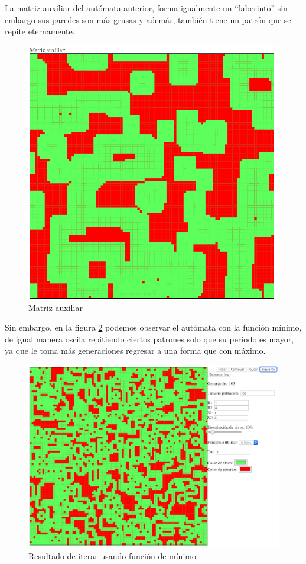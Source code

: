	La matriz auxiliar del autómata anterior, forma igualmente un ``laberinto'' sin embargo sus paredes son más grusas y además, también tiene un patrón que se repite eternamente.
	\begin{figure}[H]
		\begin{center}
			\includegraphics[scale=.3]{GOLM/img/regla1616-1-1.png}
			\caption{Matriz auxiliar}
			\label{fig:golm17}
		\end{center}
	\end{figure}

	Sin embargo, en la figura \ref{fig:golm18} podemos observar el autómata con la función mínimo, de igual manera oscila repitiendo ciertos patrones solo que su periodo es mayor, ya que le toma más generaciones regresar a una forma que con máximo.
	\begin{figure}[H]
		\begin{center}
			\includegraphics[scale=.3]{GOLM/img/regla1616-2.png}
			\caption{Resultado de iterar usando función de mínimo}
			\label{fig:golm18}
		\end{center}
	\end{figure}

